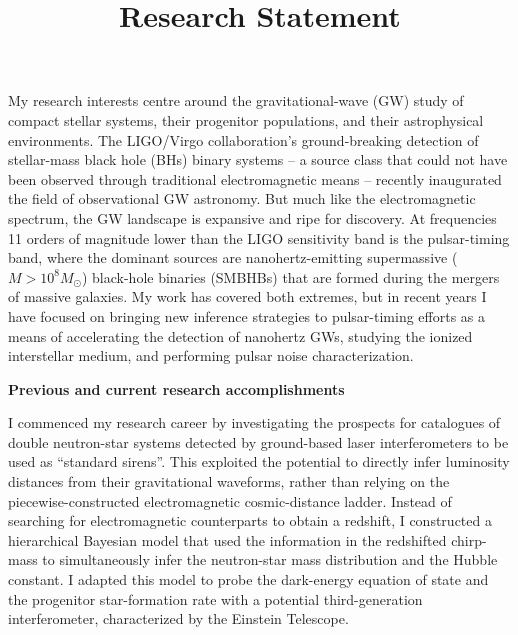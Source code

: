 \documentclass[11pt,letterpaper,sans]{moderncv} %
\title{\huge{Research Statement}}
\begin{document}
\makecvtitle %
\vspace{-6mm}

My research interests centre around the gravitational-wave (GW) study of compact stellar systems, their progenitor populations, and their astrophysical environments. The LIGO/Virgo collaboration's ground-breaking detection of stellar-mass black hole (BHs) binary systems -- a source class that could not have been observed through traditional electromagnetic means -- recently inaugurated the field of observational GW astronomy. But much like the electromagnetic spectrum, the GW landscape is expansive and ripe for discovery. At frequencies 11 orders of magnitude lower than the LIGO sensitivity band is the pulsar-timing band, where the dominant sources are nanohertz-emitting supermassive ($M > 10^8M_\odot$) black-hole binaries (SMBHBs) that are formed during the mergers of massive galaxies. My work has covered both extremes, but in recent years I have focused on bringing new inference strategies to pulsar-timing efforts as a means of accelerating the detection of nanohertz GWs, studying the ionized interstellar medium, and performing pulsar noise characterization.
\vspace{1mm}

\textbf{Previous and current research accomplishments}
\vspace{1mm}

I commenced my research career by investigating the prospects for catalogues of double neutron-star systems detected by ground-based laser interferometers to be used as ``standard sirens''. This exploited the potential to directly infer luminosity distances from their gravitational waveforms, rather than relying on the piecewise-constructed electromagnetic cosmic-distance ladder. Instead of searching for electromagnetic counterparts to obtain a redshift, I constructed a hierarchical Bayesian model that used the information in the redshifted chirp-mass to simultaneously infer the neutron-star mass distribution and the Hubble constant. %
I adapted this model to probe the dark-energy equation of state and the progenitor star-formation rate with a potential third-generation interferometer, characterized by the Einstein Telescope.
\vspace{1mm}
\end{document}
